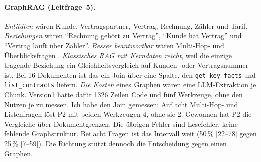 \paragraph{GraphRAG (Leitfrage~5).} \emph{Entitäten} wären Kunde, Vertragspartner, Vertrag, Rechnung, Zähler und Tarif. \emph{Beziehungen} wären \enquote{Rechnung gehört zu Vertrag}, \enquote{Kunde hat Vertrag} und \enquote{Vertrag läuft über Zähler}. \emph{Besser beantwortbar} wären Multi-Hop- und Überblicksfragen \cite{edge2024}. \emph{Klassisches RAG mit Kerndaten reicht}, weil die einzige tragende Beziehung ein Gleichheitsvergleich auf Kunden- oder Vertragsnummer ist. Bei 16 Dokumenten ist das ein Join über eine Spalte, den \texttt{get\_key\_facts} und \texttt{list\_contracts} liefern. \emph{Die Kosten} eines Graphen wären eine LLM-Extraktion je Chunk. Version1 hatte dafür 1326 Zeilen Code und fünf Werkzeuge, ohne den Nutzen je zu messen. Ich habe den Join gemessen: Auf acht Multi-Hop- und Listenfragen löst P2 mit beiden Werkzeugen 4, ohne sie 2. Gewonnen hat P2 die Vergleiche über Dokumentgrenzen. Die übrigen Fehler sind Lesefehler, keine fehlende Graphstruktur. Bei acht Fragen ist das Intervall weit (50\,\% [22--78] gegen 25\,\% [7--59]). Die Richtung stützt dennoch die Entscheidung gegen einen Graphen.
